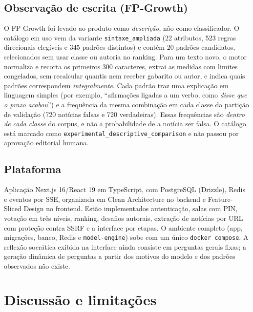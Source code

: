 \documentclass[brazilian,11pt,a4paper]{article}
\begin{document}
\subsection{Observação de escrita (FP-Growth)}

O FP-Growth foi levado ao produto como \emph{descrição}, não como classificador. O catálogo em uso vem da variante \texttt{sintaxe\_ampliada} (22 atributos, 523 regras direcionais elegíveis e 345 padrões distintos) e contém 20 padrões candidatos, selecionados sem usar classe ou autoria no ranking. Para um texto novo, o motor normaliza e recorta os primeiros 300 caracteres, extrai as medidas com limites congelados, sem recalcular quantis nem receber gabarito ou autor, e indica quais padrões correspondem \emph{integralmente}. Cada padrão traz uma explicação em linguagem simples (por exemplo, ``afirmações ligadas a um verbo, como \emph{disse que o prazo acabou}'') e a frequência da mesma combinação em cada classe da partição de validação (720 notícias falsas e 720 verdadeiras). Essas frequências são \emph{dentro de cada classe} do corpus, e não a probabilidade de a notícia ser falsa. O catálogo está marcado como \texttt{experimental\_descriptive\_comparison} e não passou por aprovação editorial humana.

\subsection{Plataforma}

Aplicação Next.js 16/React 19 em TypeScript, com PostgreSQL (Drizzle), Redis e eventos por SSE, organizada em Clean Architecture no backend e Feature-Sliced Design no frontend. Estão implementados autenticação, salas com PIN, votação em três níveis, ranking, desafios autorais, extração de notícias por URL com proteção contra SSRF e a interface por etapas. O ambiente completo (app, migrações, banco, Redis e \texttt{model-engine}) sobe com um único \texttt{docker compose}. A reflexão socrática exibida na interface ainda consiste em perguntas gerais fixas; a geração dinâmica de perguntas a partir dos motivos do modelo e dos padrões observados não existe.

\section{Discussão e limitações}
\end{document}
